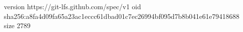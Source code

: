version https://git-lfs.github.com/spec/v1
oid sha256:a8fa4d09fa65a23ac1eccc61dbad01c7ec26994bf095d7b8b041e61e79418688
size 2789
